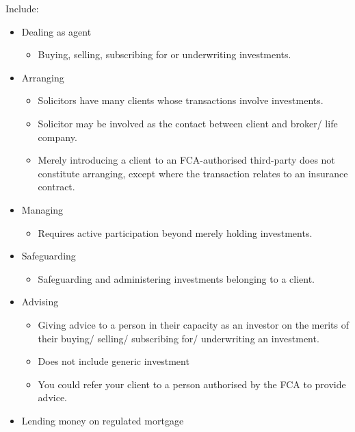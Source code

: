 \documentclass[
]{article}
\providecommand{\tightlist}{%
  \setlength{\itemsep}{0pt}\setlength{\parskip}{0pt}}
\begin{document}
Include:

\begin{itemize}
\tightlist
\item
  Dealing as agent

  \begin{itemize}
  \tightlist
  \item
    Buying, selling, subscribing for or underwriting investments.
  \end{itemize}
\item
  Arranging

  \begin{itemize}
  \tightlist
  \item
    Solicitors have many clients whose transactions involve investments.
  \item
    Solicitor may be involved as the contact between client and broker/
    life company.
  \item
    Merely introducing a client to an FCA-authorised third-party does
    not constitute arranging, except where the transaction relates to an
    insurance contract.
  \end{itemize}
\item
  Managing

  \begin{itemize}
  \tightlist
  \item
    Requires active participation beyond merely holding investments.
  \end{itemize}
\item
  Safeguarding

  \begin{itemize}
  \tightlist
  \item
    Safeguarding and administering investments belonging to a client.
  \end{itemize}
\item
  Advising

  \begin{itemize}
  \tightlist
  \item
    Giving advice to a person in their capacity as an investor on the
    merits of their buying/ selling/ subscribing for/ underwriting an
    investment.
  \item
    Does not include generic investment
  \item
    You could refer your client to a person authorised by the FCA to
    provide advice.
  \end{itemize}
\item
  Lending money on regulated mortgage
\end{itemize}
\end{document}
